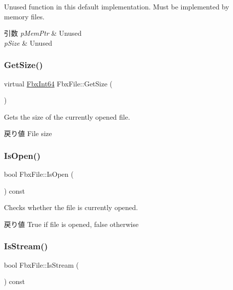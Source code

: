 Unused function in this default implementation. Must be implemented by memory files. 
\begin{DoxyParams}{引数}
{\em p\+Mem\+Ptr} & Unused \\
\hline
{\em p\+Size} & Unused \\
\hline
\end{DoxyParams}
\mbox{\label{class_fbx_file_aa7d93faa5ec8ef431b6c9b82845e8271}} 
\subsubsection{\texorpdfstring{Get\+Size()}{GetSize()}}
{\footnotesize\ttfamily virtual \hyperlink{fbxtypes_8h_ac7e1334c7c6aacc9c8a9dccddebb4368}{Fbx\+Int64} Fbx\+File\+::\+Get\+Size (\begin{DoxyParamCaption}{ }\end{DoxyParamCaption})\hspace{0.3cm}{\ttfamily [virtual]}}

Gets the size of the currently opened file. \begin{DoxyReturn}{戻り値}
File size 
\end{DoxyReturn}
\mbox{\label{class_fbx_file_acf436397d99f8b7fb5baf5b32eac26b1}} 
\subsubsection{\texorpdfstring{Is\+Open()}{IsOpen()}}
{\footnotesize\ttfamily bool Fbx\+File\+::\+Is\+Open (\begin{DoxyParamCaption}{ }\end{DoxyParamCaption}) const}

Checks whether the file is currently opened. \begin{DoxyReturn}{戻り値}
True if file is opened, false otherwise 
\end{DoxyReturn}
\mbox{\label{class_fbx_file_ae515a0ebd07a7ebedd0a62b5299cd417}} 
\subsubsection{\texorpdfstring{Is\+Stream()}{IsStream()}}
{\footnotesize\ttfamily bool Fbx\+File\+::\+Is\+Stream (\begin{DoxyParamCaption}{ }\end{DoxyParamCaption}) const}

